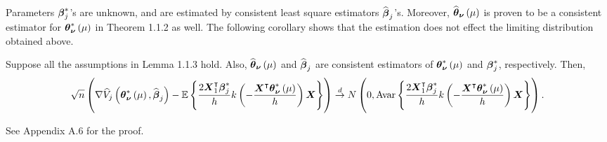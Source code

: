 %
%

Parameters $\boldsymbol{\beta}_j^*$'s are unknown, and are estimated by consistent least square estimators $\widehat{\boldsymbol{\beta}}_j$'s. Moreover, $\widehat{\boldsymbol{\theta}}_{\boldsymbol{\nu}}\left(\mu\right)$ is proven to be a consistent estimator for $\boldsymbol{\theta}^*_{\boldsymbol{\nu}}\left(\mu\right)$ in Theorem 1.1.2 as well. The following corollary shows that the estimation does not effect the limiting distribution obtained above.
\begin{corollary}
Suppose all the assumptions in Lemma 1.1.3 hold. Also, $\widehat{\boldsymbol{\theta}}_{\boldsymbol{\nu}}\left(\mu\right)$ and $\widehat{\boldsymbol{\beta}}_{j}$ are consistent estimators of $\boldsymbol{\theta}^*_{\boldsymbol{\nu}}\left(\mu\right)$ and $\boldsymbol{\beta}_{j}^*$, respectively. Then, 
\begin{gather}
\begin{flalign*}
\sqrt{n}\left(\nabla\widehat{V}_j\left(\boldsymbol{\theta}^*_{\boldsymbol{\nu}}\left(\mu\right)  , \widehat{\boldsymbol{\beta}}_j\right) - \mathbb{E}\left\{\frac{2\boldsymbol{X}_{1}^{\intercal}\boldsymbol{\beta}^*_j}{h}k\left(-\frac{\boldsymbol{X}^{\intercal}\boldsymbol{\theta}^*_{\boldsymbol{\nu}}\left(\mu\right)}{h}\right)\boldsymbol{X}\right\}\right)\overset{d}{\to}N\left(0,\text{Avar}\left\{\frac{2\boldsymbol{X}_1^{\intercal}\boldsymbol{\beta}^*_j}{h}k\left(-\frac{\boldsymbol{X}^{\intercal}\boldsymbol{\theta}^*_{\boldsymbol{\nu}}\left(\mu\right)}{h}\right)\boldsymbol{X}\right\}\right).
\end{flalign*}
\end{gather}
\end{corollary}
See Appendix A.6 for the proof.
